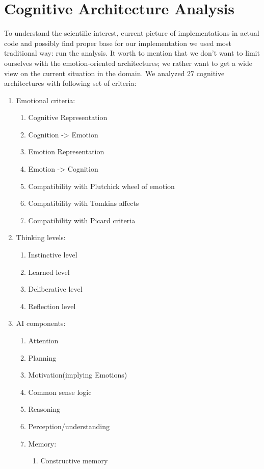 \section{Cognitive Architecture Analysis}

To understand the scientific interest, current picture of implementations in actual code and possibly find proper base for our implementation we used most traditional way: run the analysis. It worth to mention that we don't want to limit ourselves with the emotion-oriented architectures; we rather want to get a wide view on the current situation in the domain. We analyzed 27 cognitive architectures with following set of criteria:

\begin{enumerate}
 \item  Emotional criteria:
 \begin{enumerate}
  \item  Cognitive Representation
  \item  Cognition -> Emotion
  \item  Emotion Representation
  \item  Emotion -> Cognition
  \item  Compatibility with Plutchick wheel of emotion
  \item  Compatibility with Tomkins affects
  \item  Compatibility with Picard criteria
 \end{enumerate}
 \item  Thinking levels:
 \begin{enumerate}
  \item  Instinctive level
  \item  Learned level
  \item  Deliberative level
  \item  Reflection level
 \end{enumerate}
 \item  AI components:
 \begin{enumerate}
  \item  Attention
  \item  Planning
  \item  Motivation(implying Emotions)
  \item  Common sense logic
  \item  Reasoning
  \item  Perception/understanding
  \item  Memory:
  \begin{enumerate}
   \item  Constructive memory

\end{enumerate}
\end{enumerate}
\end{enumerate}
